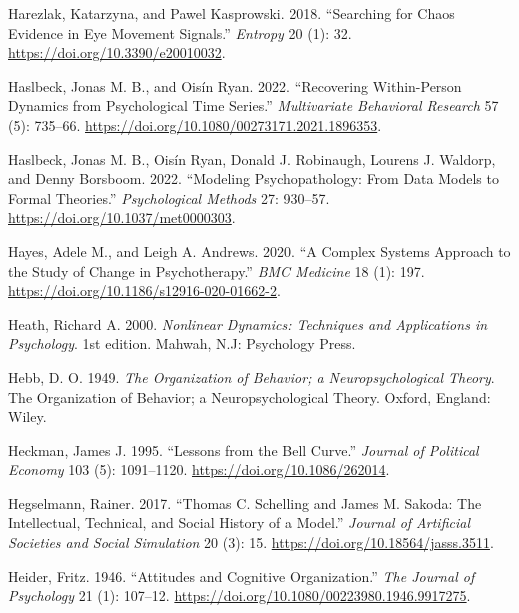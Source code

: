 \documentclass[
  a4paper,
  DIV=11,
  numbers=noendperiod]{scrreprt}
\newlength{\cslhangindent}
\newlength{\cslentryspacingunit} %
\newenvironment{CSLReferences}[2] %
 {%
  \setlength{\parindent}{0pt}
  \ifodd #1
  \let\oldpar\par
  \def\par{\hangindent=\cslhangindent\oldpar}
  \fi
  \setlength{\parskip}{#2\cslentryspacingunit}
 }%
 {}
\begin{document}
\begin{CSLReferences}{1}{0}
\leavevmode{}%
Harezlak, Katarzyna, and Pawel Kasprowski. 2018. {``Searching for Chaos
Evidence in Eye Movement Signals.''} \emph{Entropy} 20 (1): 32.
\url{https://doi.org/10.3390/e20010032}.

\leavevmode{}%
Haslbeck, Jonas M. B., and Oisín Ryan. 2022. {``Recovering
{Within-Person Dynamics} from {Psychological Time Series}.''}
\emph{Multivariate Behavioral Research} 57 (5): 735--66.
\url{https://doi.org/10.1080/00273171.2021.1896353}.

\leavevmode{}%
Haslbeck, Jonas M. B., Oisín Ryan, Donald J. Robinaugh, Lourens J.
Waldorp, and Denny Borsboom. 2022. {``Modeling Psychopathology: {From}
Data Models to Formal Theories.''} \emph{Psychological Methods} 27:
930--57. \url{https://doi.org/10.1037/met0000303}.

\leavevmode{}%
Hayes, Adele M., and Leigh A. Andrews. 2020. {``A Complex Systems
Approach to the Study of Change in Psychotherapy.''} \emph{BMC Medicine}
18 (1): 197. \url{https://doi.org/10.1186/s12916-020-01662-2}.

\leavevmode{}%
Heath, Richard A. 2000. \emph{Nonlinear {Dynamics}: {Techniques} and
{Applications} in {Psychology}}. 1st edition. {Mahwah, N.J}: {Psychology
Press}.

\leavevmode{}%
Hebb, D. O. 1949. \emph{The Organization of Behavior; a
Neuropsychological Theory}. The Organization of Behavior; a
Neuropsychological Theory. {Oxford, England}: {Wiley}.

\leavevmode{}%
Heckman, James J. 1995. {``Lessons from the {Bell Curve}.''}
\emph{Journal of Political Economy} 103 (5): 1091--1120.
\url{https://doi.org/10.1086/262014}.

\leavevmode{}%
Hegselmann, Rainer. 2017. {``Thomas {C}. {Schelling} and {James M}.
{Sakoda}: {The Intellectual}, {Technical}, and {Social History} of a
{Model}.''} \emph{Journal of Artificial Societies and Social Simulation}
20 (3): 15. \url{https://doi.org/10.18564/jasss.3511}.

\leavevmode{}%
Heider, Fritz. 1946. {``Attitudes and {Cognitive Organization}.''}
\emph{The Journal of Psychology} 21 (1): 107--12.
\url{https://doi.org/10.1080/00223980.1946.9917275}.


\end{CSLReferences}
\end{document}
